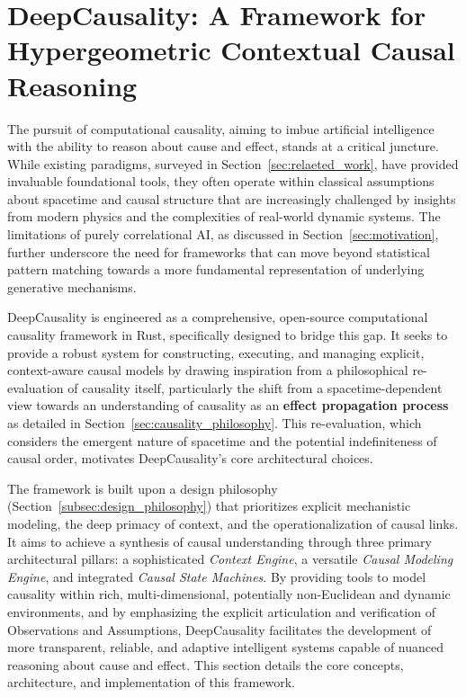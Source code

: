 \section{DeepCausality: A Framework for Hypergeometric Contextual Causal Reasoning}
\label{sec:deep_causality}

The pursuit of computational causality, aiming to imbue artificial intelligence with the ability to reason about cause and effect, stands at a critical juncture. While existing paradigms, surveyed in Section~\ref{sec:relaeted_work}, have provided invaluable foundational tools, they often operate within classical assumptions about spacetime and causal structure that are increasingly challenged by insights from modern physics and the complexities of real-world dynamic systems. The limitations of purely correlational AI, as discussed in Section~\ref{sec:motivation}, further underscore the need for frameworks that can move beyond statistical pattern matching towards a more fundamental representation of underlying generative mechanisms.

DeepCausality is engineered as a comprehensive, open-source computational causality framework in Rust, specifically designed to bridge this gap. It seeks to provide a robust system for constructing, executing, and managing explicit, context-aware causal models by drawing inspiration from a philosophical re-evaluation of causality itself, particularly the shift from a spacetime-dependent view towards an understanding of causality as an \textbf{effect propagation process} as detailed in Section~\ref{sec:causality_philosophy}. This re-evaluation, which considers the emergent nature of spacetime and the potential indefiniteness of causal order, motivates DeepCausality's core architectural choices.

The framework is built upon a design philosophy (Section~\ref{subsec:design_philosophy}) that prioritizes explicit mechanistic modeling, the deep primacy of context, and the operationalization of causal links. It aims to achieve a synthesis of causal understanding through three primary architectural pillars: a sophisticated \textit{Context Engine}, a versatile \textit{Causal Modeling Engine}, and integrated \textit{Causal State Machines}. By providing tools to model causality within rich, multi-dimensional, potentially non-Euclidean and dynamic environments, and by emphasizing the explicit articulation and verification of Observations and Assumptions, DeepCausality facilitates the development of more transparent, reliable, and adaptive intelligent systems capable of nuanced reasoning about cause and effect. This section details the core concepts, architecture, and implementation of this framework.

